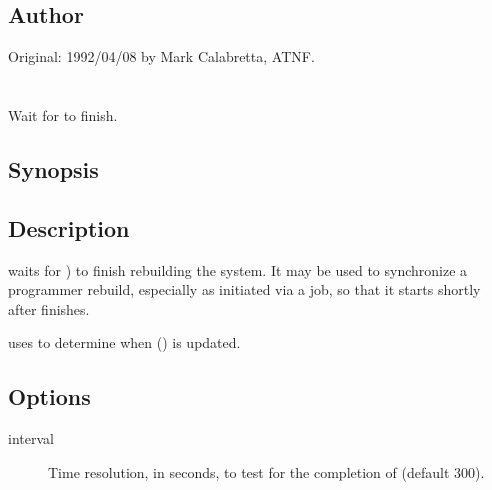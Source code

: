 \subsection*{Author}

Original: 1992/04/08 by Mark Calabretta, ATNF.

 
\newpage
\section{}
\label{inhold}
 
Wait for  to finish.

\subsection*{Synopsis}
 
\begin{synopsis}
\end{synopsis}
 
\subsection*{Description}

 waits for ) to finish rebuilding the system.  It
may be used to synchronize a programmer rebuild, especially as initiated via a
 job, so that it starts shortly after  finishes.

 uses  to determine when 
() is updated.
 
\subsection*{Options}
 
\begin{description}
\item[ interval]
   Time resolution, in seconds, to test for the completion of 
   (default 300).

\end{description}
 

